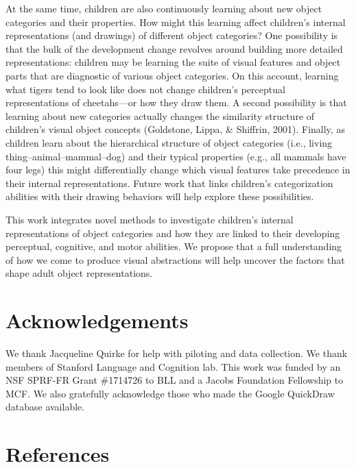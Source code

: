 \documentclass[10pt, letterpaper]{article}
\begin{document}
At the same time, children are also continuously learning about new
object categories and their properties. How might this learning affect
children's internal representations (and drawings) of different object
categories? One possibility is that the bulk of the development change
revolves around building more detailed representations: children may be
learning the suite of visual features and object parts that are
diagnostic of various object categories. On this account, learning what
tigers tend to look like does not change children's perceptual
representations of cheetahs---or how they draw them. A second
possibility is that learning about new categories actually changes the
similarity structure of children's visual object concepts (Goldstone,
Lippa, \& Shiffrin, 2001). Finally, as children learn about the
hierarchical structure of object categories (i.e., living
thing--animal--mammal--dog) and their typical properties (e.g., all
mammals have four legs) this might differentially change which visual
features take precedence in their internal representations. Future work
that links children's categorization abilities with their drawing
behaviors will help explore these possibilities.

This work integrates novel methods to investigate children's internal
representations of object categories and how they are linked to their
developing perceptual, cognitive, and motor abilities. We propose that a
full understanding of how we come to produce visual abstractions will
help uncover the factors that shape adult object representations.

\vspace{1em}

\vspace{1em}

\section{Acknowledgements}\label{acknowledgements}

We thank Jacqueline Quirke for help with piloting and data collection.
We thank members of Stanford Language and Cognition lab. This work was
funded by an NSF SPRF-FR Grant \#1714726 to BLL and a Jacobs Foundation
Fellowship to MCF. We also gratefully acknowledge those who made the
Google QuickDraw database available.

\section{References}\label{references}
\end{document}
